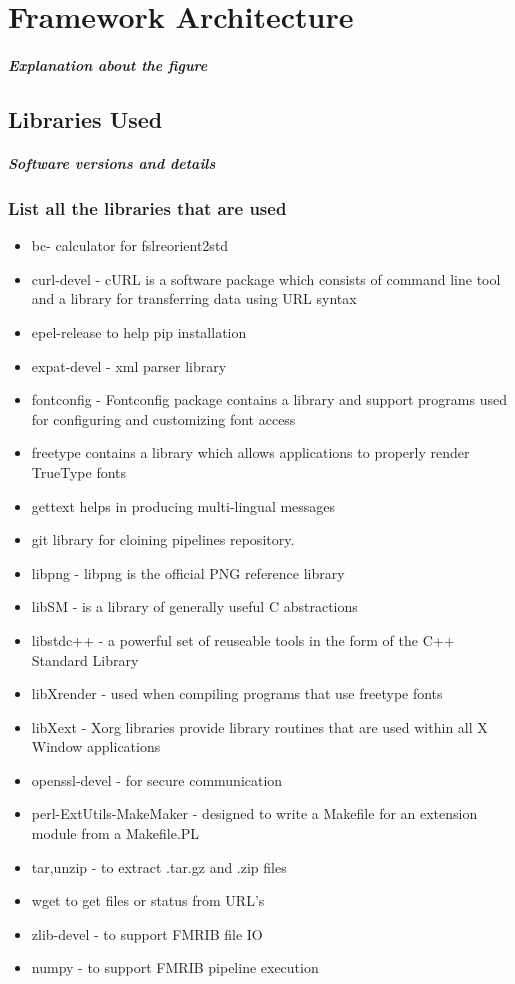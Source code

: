 \chapter{Framework Architecture}
\paragraph{Explanation about the figure}

\section{Libraries Used}
\paragraph{Software versions and details}
\subsection{List all the libraries that are used}
\begin{itemize}
 \item bc- calculator for fslreorient2std
 \item curl-devel - cURL is a software package which consists of command line tool and a library for transferring data using URL syntax
 \item epel-release to help pip installation
 \item expat-devel - xml parser library
\item fontconfig - Fontconfig package contains a library and support programs used for configuring and customizing font access
 \item freetype contains a library which allows applications to properly render TrueType fonts
 \item gettext helps in producing multi-lingual messages
\item git library for cloining pipelines repository.
\item libpng - libpng is the official PNG reference library
\item libSM - is a library of generally useful C abstractions
\item libstdc++ - a powerful set of reuseable tools in the form of the C++ Standard Library
\item libXrender - used when compiling programs that use freetype fonts
\item libXext - Xorg libraries provide library routines that are used within all X Window applications
\item openssl-devel - for secure communication
\item perl-ExtUtils-MakeMaker - designed to write a Makefile for an extension module from a Makefile.PL
\item tar,unzip - to extract .tar.gz and .zip files
\item wget to get files or status from URL's
\item zlib-devel - to support FMRIB file IO
\item numpy - to support FMRIB pipeline execution
\end{itemize}

